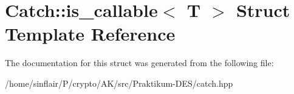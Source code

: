 \hypertarget{structCatch_1_1is__callable}{}\section{Catch\+:\+:is\+\_\+callable$<$ T $>$ Struct Template Reference}
\label{structCatch_1_1is__callable}


The documentation for this struct was generated from the following file\+:\begin{DoxyCompactItemize}
\item 
/home/sinflair/\+P/crypto/\+A\+K/src/\+Praktikum-\/\+D\+E\+S/catch.\+hpp\end{DoxyCompactItemize}

